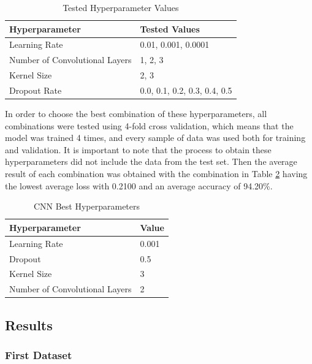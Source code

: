 \begin{table}[H]
    \centering
    \caption{Tested Hyperparameter Values}
    \label{table:cnn_hyperparameters}
    \begin{tabular}{|l|l|}
        \hline
        Hyperparameter & Tested Values \\
        \hline
        Learning Rate & 0.01, 0.001, 0.0001 \\
        \hline
        Number of Convolutional Layers & 1, 2, 3 \\
        \hline
        Kernel Size & 2, 3 \\
        \hline
        Dropout Rate & 0.0, 0.1, 0.2, 0.3, 0.4, 0.5 \\
        \hline
    \end{tabular}
\end{table}

In order to choose the best combination of these hyperparameters, all combinations were tested using 4-fold cross validation, which means that the model was trained 4 times, and every sample of data was used both for training and validation. It is important to note that the process to obtain these hyperparameters did not include the data from the test set. Then the average result of each combination was obtained with the combination in Table \ref{table:cnn_best_hyperparameters} having the lowest average loss with 0.2100 and an average accuracy of 94.20\%.

\begin{table}[H]
    \centering
    \caption{CNN Best Hyperparameters}
    \label{table:cnn_best_hyperparameters}
    \begin{tabular}{|l|l|}
        \hline
        Hyperparameter & Value \\
        \hline
        Learning Rate & 0.001 \\
        \hline
        Dropout & 0.5 \\
        \hline
        Kernel Size & 3 \\
        \hline
        Number of Convolutional Layers & 2 \\
        \hline
    \end{tabular}
\end{table}

\subsection{Results}

\subsubsection{First Dataset}

